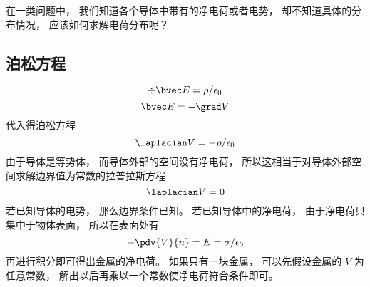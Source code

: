 
\begin{issues}
\issueDraft
\end{issues}

在一类问题中， 我们知道各个导体中带有的净电荷或者电势， 却不知道具体的分布情况， 应该如何求解电荷分布呢？

\subsection{泊松方程}
\begin{equation}
\div \bvec E = \rho/\epsilon_0
\end{equation}
\begin{equation}
\bvec E = -\grad V
\end{equation}
代入得泊松方程
\begin{equation}
\laplacian V = -\rho/\epsilon_0
\end{equation}
由于导体是等势体， 而导体外部的空间没有净电荷， 所以这相当于对导体外部空间求解边界值为常数的拉普拉斯方程
\begin{equation}
\laplacian V = 0
\end{equation}
若已知导体的电势， 那么边界条件已知。 若已知导体中的净电荷， 由于净电荷只集中于物体表面， 所以在表面处有
\begin{equation}
-\pdv{V}{n} = E = \sigma/\epsilon_0
\end{equation}
再进行积分即可得出金属的净电荷。 如果只有一块金属， 可以先假设金属的 $V$ 为任意常数， 解出以后再乘以一个常数使净电荷符合条件即可。

